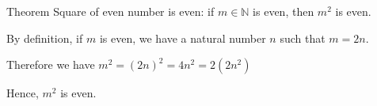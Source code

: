 Theorem Square of even number is even: if $m \in \mathbb{N}$ is even, then $m^2$ is even.

By definition, if $m$ is even, we have a natural number $n$ such that $m = 2n$.

Therefore we have $m^2 = (2n)^2 = 4n^2 = 2(2n^2)$

Hence, $m^2$ is even.